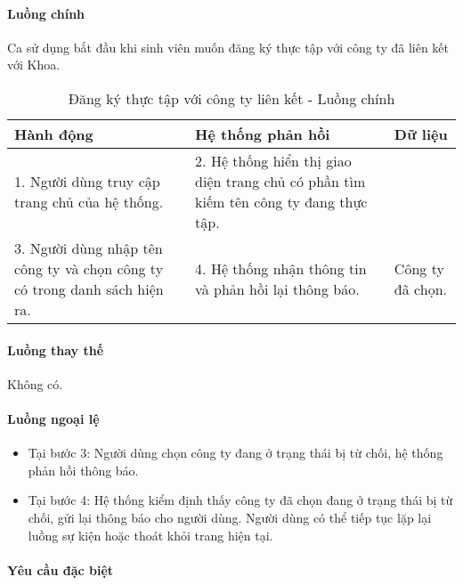 \documentclass[./../main.tex]{subfiles}
\begin{document}
\paragraph*{Luồng chính} Ca sử dụng bắt đầu khi sinh viên muốn đăng ký thực tập với công ty đã liên kết với Khoa.

\begin{table}[H]
  \caption{Đăng ký thực tập với công ty liên kết - Luồng chính}
  \label{tab:register_company}
  \begin{tabularx}{\textwidth}{|X|X|X|}
  \hline
  \textbf{Hành động}                                                      & \textbf{Hệ thống phản hồi}                                                        & \textbf{Dữ liệu} \\ \hline
  1. Người dùng truy cập trang chủ của hệ thống.                             & 2. Hệ thống hiển thị giao diện trang chủ có phần tìm kiếm tên công ty đang thực tập. &                  \\ \hline
  3. Người dùng nhập tên công ty và chọn công ty có trong danh sách hiện ra. & 4. Hệ thống nhận thông tin và phản hồi lại thông báo.                                & Công ty đã chọn. \\ \hline
  \end{tabularx}
\end{table}

\paragraph*{Luồng thay thế} Không có.

\paragraph*{Luồng ngoại lệ}

\begin{itemize}
\item
  Tại bước 3: Người dùng chọn công ty đang ở trạng thái bị từ chối, hệ
  thống phản hồi thông báo.
\item
  
  Tại bước 4: Hệ thống kiểm định thấy công ty đã chọn đang ở trạng thái
  bị từ chối, gửi lại thông báo cho người dùng. Người dùng có thể tiếp
  tục lặp lại luồng sự kiện hoặc thoát khỏi trang hiện tại.
  
\end{itemize}

\paragraph*{Yêu cầu đặc biệt}
\end{document}
